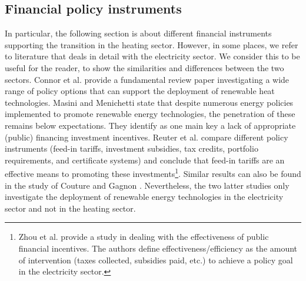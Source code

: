 \subsection{Financial policy instruments}\label{aspect3}
In particular, the following section is about different financial instruments supporting the transition in the heating sector. However, in some places, we refer to literature that deals in detail with the electricity sector. We consider this to be useful for the reader, to show the similarities and differences between the two sectors. Connor et al. \cite{connor2013devising} provide a fundamental review paper investigating a wide range of policy options that can support the deployment of renewable heat technologies. Masini and Menichetti \cite{masini2012impact} state that despite numerous energy policies implemented to promote renewable energy technologies, the penetration of these remains below expectations. They identify as one main key a lack of appropriate (public) financing investment incentives. Reuter et al. \cite{reuter2012renewable} compare different policy instruments (feed-in tariffs, investment subsidies, tax credits, portfolio requirements, and certificate systems) and conclude that feed-in tariffs are an effective means to promoting these investments\footnote{Zhou et al. \cite{zhou2011designing} provide a study in dealing with the effectiveness of public financial incentives. The authors define effectiveness/efficiency as the amount of intervention (taxes collected, subsidies paid, etc.) to achieve a policy goal in the electricity sector.}. Similar results can also be found in the study of Couture and Gagnon \cite{couture2010analysis}. Nevertheless, the two latter studies only investigate the deployment of renewable energy technologies in the electricity sector and not in the heating sector.\vspace{0.5cm} 

